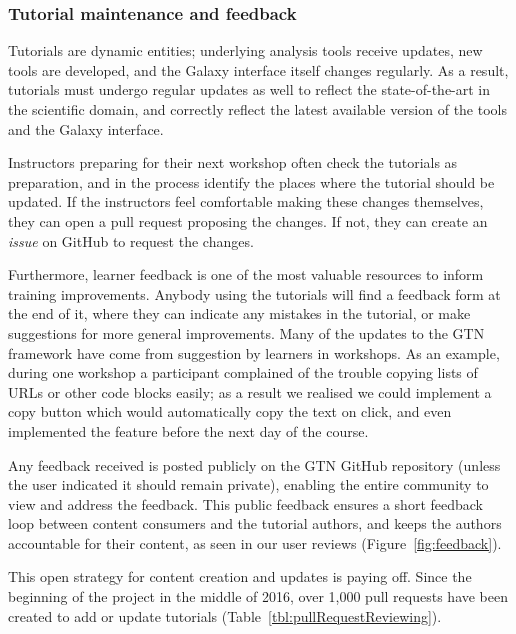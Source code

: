 \documentclass[10pt,letterpaper]{article}
\begin{document}
\subsubsection*{Tutorial maintenance and feedback}

Tutorials are dynamic entities; underlying analysis tools receive updates, new tools are developed, and the Galaxy interface itself changes regularly.
As a result, tutorials must undergo regular updates as well to reflect the state-of-the-art in the scientific domain, and correctly reflect the latest available version of the tools and the Galaxy interface.

Instructors preparing for their next workshop often check the tutorials as preparation, and in the process identify the places where the tutorial should be updated.
If the instructors feel comfortable making these changes themselves, they can open a pull request proposing the changes.
If not, they can create an \emph{issue} on GitHub to request the changes.

Furthermore, learner feedback is one of the most valuable resources to inform training improvements.
Anybody using the tutorials will find a feedback form at the end of it, where they can indicate any mistakes in the tutorial, or make suggestions for more general improvements. Many of the updates to the GTN framework have come from suggestion by learners in workshops.
As an example, during one workshop a participant complained of the trouble copying lists of URLs or other code blocks easily; as a result we realised we could implement a copy button which would automatically copy the text on click, and even implemented the feature before the next day of the course.

Any feedback received is posted publicly on the GTN GitHub repository (unless the user indicated it should remain private), enabling the entire community to view and address the feedback.
This public feedback ensures a short feedback loop between content consumers and the tutorial authors, and keeps the authors accountable for their content, as seen in our user reviews (Figure~\ref{fig:feedback}).

This open strategy for content creation and updates is paying off.
Since the beginning of the project in the middle of 2016, over 1,000 pull requests have been created to add or update tutorials (Table~\ref{tbl:pullRequestReviewing}).
\end{document}
